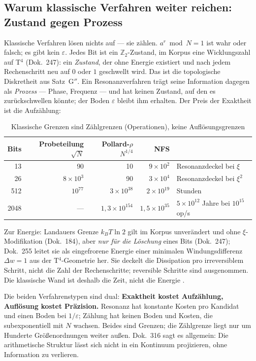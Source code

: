 \subsection{Warum klassische Verfahren weiter reichen: Zustand gegen Prozess}

Klassische Verfahren lösen nichts auf --- sie zählen. $a^r \bmod N = 1$ ist wahr
oder falsch; es gibt kein $\varepsilon$. Jedes Bit ist ein $\mathbb{Z}_2$-Zustand,
im Korpus eine Wicklungszahl auf T$^4$ (Dok.~247): ein \emph{Zustand}, der ohne
Energie existiert und nach jedem Rechenschritt neu auf $0$ oder $1$ geschwellt
wird. Das ist die topologische Diskretheit aus Satz~G$''$. Ein Resonanzverfahren
trägt seine Information dagegen als \emph{Prozess} --- Phase, Frequenz --- und
hat keinen Zustand, auf den es zurückschwellen könnte; der Boden $\varepsilon$
bleibt ihm erhalten. Der Preis der Exaktheit ist die Aufzählung:

\begin{table}[H]
\centering
\caption{Klassische Grenzen sind Zählgrenzen (Operationen), keine Auflösungsgrenzen}
\begin{tabular}{rrrrl}
\toprule
Bits & Probeteilung $\sqrt N$ & Pollard-$\rho$ $N^{1/4}$ & NFS & \\
\midrule
13 & 90 & 10 & $9\times10^{2}$ & Resonanzdeckel bei $\xi$ \\
26 & $8\times10^3$ & 90 & $3\times10^{4}$ & Resonanzdeckel bei $\xi^2$ \\
512 & $10^{77}$ & $3\times10^{38}$ & $2\times10^{19}$ & Stunden \\
2048 & --- & $1{,}3\times10^{154}$ & $1{,}5\times10^{35}$ & $5\times10^{12}$ Jahre bei $10^{15}$ op/s \\
\bottomrule
\end{tabular}
\end{table}

Zur Energie: Landauers Grenze $k_BT\ln 2$ gilt im Korpus unverändert und ohne
$\xi$-Modifikation (Dok.~184), aber \emph{nur für die Löschung} eines Bits
(Dok.~247); Dok.~255 leitet sie als eingefrorene Energie einer minimalen
Windungsdifferenz $\Delta w=1$ aus der T$^4$-Geometrie her. Sie deckelt die
Dissipation pro irreversiblem Schritt, nicht die Zahl der Rechenschritte;
reversible Schritte sind ausgenommen. Die klassische Wand ist deshalb die Zeit,
nicht die Energie \BM.

Die beiden Verfahrenstypen sind dual: \textbf{Exaktheit kostet Aufzählung,
Auflösung kostet Präzision.} Resonanz hat konstante Kosten pro Kandidat und
einen Boden bei $1/\varepsilon$; Zählung hat keinen Boden und Kosten, die
subexponentiell mit $N$ wachsen. Beides sind Grenzen; die Zählgrenze liegt
nur um Hunderte Größenordnungen weiter außen. Dok.~316 sagt es allgemein: Die
arithmetische Struktur lässt sich nicht in ein Kontinuum projizieren, ohne
Information zu verlieren.


